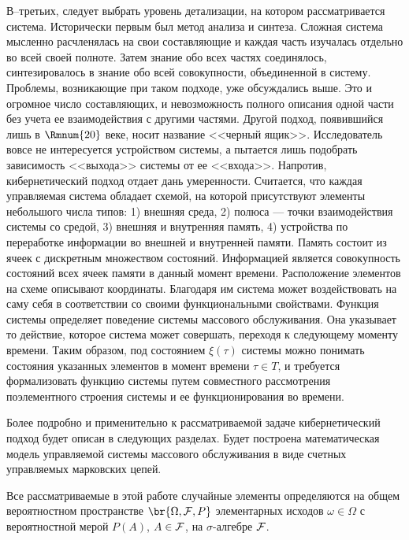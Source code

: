 В--третьих, следует выбрать уровень детализации, на котором рассматривается система. Исторически первым был метод анализа и синтеза. Сложная система мысленно расчленялась на свои составляющие и каждая часть изучалась отдельно во всей своей полноте. Затем знание обо всех частях соединялось, синтезировалось в знание обо всей совокупности, объединенной в систему. Проблемы, возникающие при таком подходе, уже обсуждались выше. Это и огромное число составляющих, и невозможность полного описания одной части без учета ее взаимодействия с другими частями. Другой подход, появившийся лишь в $\mathrm{\Rmnum{20}}$ веке, носит название <<черный ящик>>. Исследователь вовсе не интересуется устройством системы, а пытается лишь подобрать зависимость <<выхода>> системы от ее <<входа>>. Напротив, кибернетический подход отдает дань умеренности. Считается, что каждая управляемая система обладает схемой, на которой присутствуют элементы небольшого числа типов: 1) внешняя среда, 2) полюса --- точки взаимодействия системы со средой, 3) внешняя и внутренняя память, 4) устройства по переработке информации во внешней и внутренней памяти. Память состоит из ячеек с дискретным множеством состояний. Информацией является совокупность состояний всех ячеек памяти в данный момент времени. Расположение элементов на схеме описывают координаты. Благодаря им система может воздействовать на саму себя в соответствии со своими функциональными свойствами. Функция системы определяет поведение системы массового обслуживания. Она указывает то действие, которое система может совершать, переходя к следующему моменту времени. Таким образом, под состоянием $\xi(\tau)$ системы можно понимать состояния указанных элементов в момент времени $\tau \in T$, и требуется формализовать функцию системы путем совместного рассмотрения поэлементного строения системы и ее функционирования во времени. 

Более подробно и применительно к рассматриваемой задаче кибернетический подход будет описан в следующих разделах. Будет построена математическая модель управляемой системы массового обслуживания в виде счетных управляемых марковских цепей.

















Все рассматриваемые в этой работе случайные элементы определяются на общем вероятностном пространстве $\br{\Omega, {\cal F}, P}$ элементарных исходов $\omega \in \Omega$ с вероятностной мерой $P(A)$, $A \in {\cal F}$, на $\sigma$-алгебре ${\cal F}$. 

